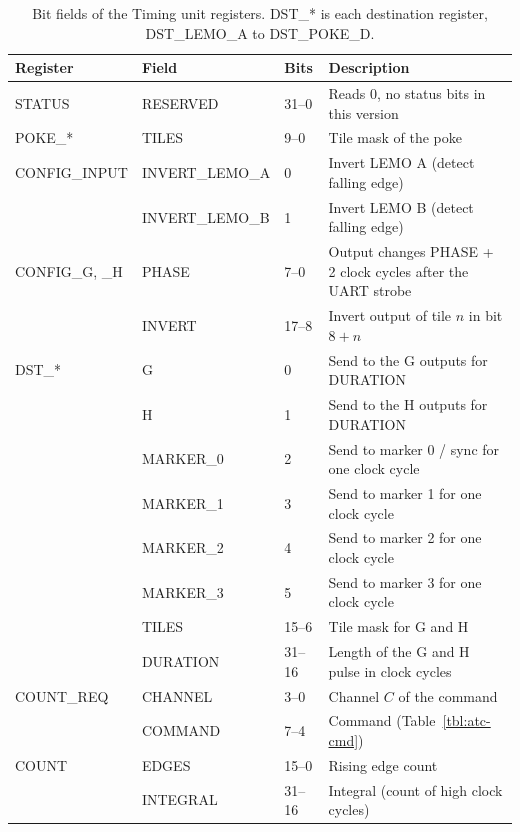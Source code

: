\documentclass[12pt]{article}
\begin{document}
\begin{table}[htbp]
\caption{\label{tbl:atc-bit-fields} Bit fields of the Timing unit registers.  DST\_* is each destination
  register, DST\_LEMO\_A to DST\_POKE\_D.}
\begin{center}
\begin{tabular}{lll>{\raggedright\arraybackslash}p{8.3cm}}
Register        & Field          & Bits   & Description \\
\hline
STATUS          & RESERVED       & 31--0  & Reads 0, no status bits in this version \\
\hline
POKE\_*         & TILES          & 9--0   & Tile mask of the poke \\
\hline
CONFIG\_INPUT   & INVERT\_LEMO\_A & 0     & Invert LEMO A (detect falling edge) \\
                & INVERT\_LEMO\_B & 1     & Invert LEMO B (detect falling edge) \\
\hline
CONFIG\_G, \_H  & PHASE          & 7--0   & Output changes PHASE + 2 clock cycles after the UART strobe \\
                & INVERT         & 17--8  & Invert output of tile $n$ in bit $8 + n$ \\
\hline
DST\_*          & G              & 0      & Send to the G outputs for DURATION \\
                & H              & 1      & Send to the H outputs for DURATION\\
                & MARKER\_0      & 2      & Send to marker 0 / sync for one clock cycle \\
                & MARKER\_1      & 3      & Send to marker 1 for one clock cycle \\
                & MARKER\_2      & 4      & Send to marker 2 for one clock cycle \\
                & MARKER\_3      & 5      & Send to marker 3 for one clock cycle \\
                & TILES          & 15--6  & Tile mask for G and H \\
                & DURATION       & 31--16 & Length of the G and H pulse in clock cycles\\
\hline
COUNT\_REQ      & CHANNEL        & 3--0   & Channel $C$ of the command \\
                & COMMAND        & 7--4   & Command (Table~\ref{tbl:atc-cmd}) \\
\hline
COUNT           & EDGES          & 15--0  & Rising edge count \\
                & INTEGRAL       & 31--16 & Integral (count of high clock cycles) \\
\end{tabular}
\end{center}
\end{table}
\end{document}
